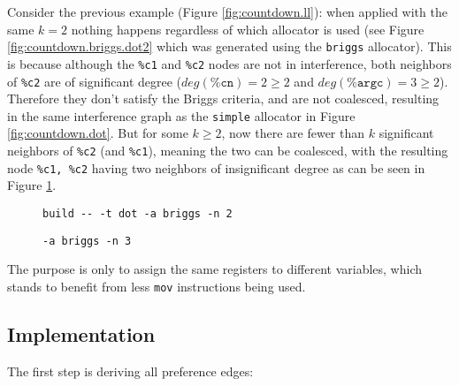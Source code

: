 \documentclass{article}
\begin{document}
Consider the previous example (Figure \ref{fig:countdown.ll}): when applied with the same \(k=2\) nothing happens regardless of which allocator is used (see Figure \ref{fig:countdown.briggs.dot2} which was generated using the \texttt{briggs} allocator). This is because although the \texttt{\%c1} and \texttt{\%c2} nodes are not in interference, both neighbors of \texttt{\%c2} are of significant degree (\(\mathit{deg}(\texttt{\%cn}) = 2 \geq 2\) and \(\mathit{deg}(\texttt{\%argc}) = 3 \geq 2\)). 
Therefore they don't satisfy the Briggs criteria, and are not coalesced, resulting in the same interference graph as the \texttt{simple} allocator in Figure \ref{fig:countdown.dot}.
But for some \(k \geq 2\), now there are fewer than \(k\) significant neighbors of \texttt{\%c2} (and \texttt{\%c1}), meaning the two can be coalesced, with the resulting node \texttt{\%c1, \%c2} having two neighbors of insignificant degree as can be seen in Figure \ref{fig:countdown.briggs.dot}.
\begin{figure}[H]
     \centering
   \begin{minipage}[b]{0.50\linewidth}
     \centering
     
     \caption{\texttt{build -{}- -t dot -a briggs -n 2}}\label{fig:countdown.briggs.dot2}
   \end{minipage}
   \begin{minipage}[b]{0.33\linewidth}
     \centering
     
     \caption{\texttt{-a briggs -n 3}}\label{fig:countdown.briggs.dot}
   \end{minipage}
\end{figure}

\noindent The purpose is only to assign the same registers to different variables, which stands to benefit from less \texttt{mov} instructions being used.
\subsection{Implementation}

The first step is deriving all preference edges:
\end{document}
